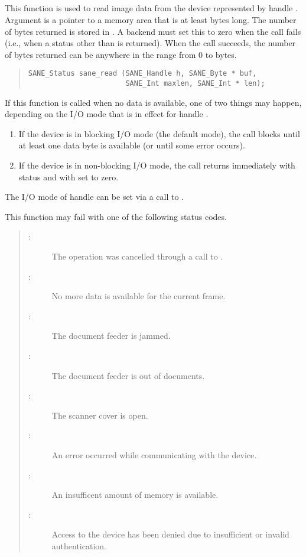 \documentclass[11pt,DVIps]{report}
\begin{document}
\subsection{}

This function is used to read image data from the device represented
by handle .  Argument  is a pointer to a memory area
that is at least  bytes long.  The number of bytes
returned is stored in .  A backend must set this to zero
when the call fails (i.e., when a status other than
 is returned).  When the call succeeds, the
number of bytes returned can be anywhere in the range from 0 to
 bytes.
\begin{quote}
\begin{verbatim}
SANE_Status sane_read (SANE_Handle h, SANE_Byte * buf,
                       SANE_Int maxlen, SANE_Int * len);
\end{verbatim}
\end{quote}
If this function is called when no data is available, one of two
things may happen, depending on the I/O mode that is in effect for
handle .
\begin{enumerate}
\item If the device is in blocking I/O mode (the default mode), the
  call blocks until at least one data byte is available (or until some
  error occurs).

\item If the device is in non-blocking I/O mode, the call returns
  immediately with status  and with
   set to zero.
\end{enumerate}
The I/O mode of handle  can be set via a call to
.

This function may fail with one of the following status codes.
\begin{quote}
\begin{description}
\item[:] The operation was cancelled through
  a call to .
\item[:] No more data is available for the
  current frame.
\item[:] The document feeder is jammed.
\item[:] The document feeder is out of
  documents.
\item[:] The scanner cover is open.
\item[:] An error occurred while communicating
  with the device.
\item[:] An insufficent amount of memory
  is available.
\item[:] Access to the device has
  been denied due to insufficient or invalid authentication.
\end{description}
\end{quote}
\end{document}
